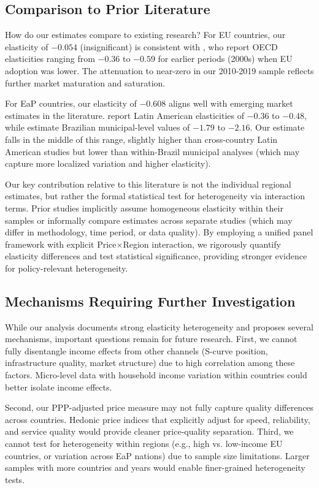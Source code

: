 \documentclass[12pt,review]{elsarticle}
\begin{document}
\subsection{Comparison to Prior Literature}

How do our estimates compare to existing research? For EU countries, our elasticity of $-0.054$ (insignificant) is consistent with \citet{cardona2009demand}, who report OECD elasticities ranging from $-0.36$ to $-0.59$ for earlier periods (2000s) when EU adoption was lower. The attenuation to near-zero in our 2010-2019 sample reflects further market maturation and saturation.

For EaP countries, our elasticity of $-0.608$ aligns well with emerging market estimates in the literature. \citet{galperin2017price} report Latin American elasticities of $-0.36$ to $-0.48$, while \citet{macedo2011elasticity} estimate Brazilian municipal-level values of $-1.79$ to $-2.16$. Our estimate falls in the middle of this range, slightly higher than cross-country Latin American studies but lower than within-Brazil municipal analyses (which may capture more localized variation and higher elasticity).

Our key contribution relative to this literature is not the individual regional estimates, but rather the formal statistical test for heterogeneity via interaction terms. Prior studies implicitly assume homogeneous elasticity within their samples or informally compare estimates across separate studies (which may differ in methodology, time period, or data quality). By employing a unified panel framework with explicit Price$\times$Region interaction, we rigorously quantify elasticity differences and test statistical significance, providing stronger evidence for policy-relevant heterogeneity.

\subsection{Mechanisms Requiring Further Investigation}

While our analysis documents strong elasticity heterogeneity and proposes several mechanisms, important questions remain for future research. First, we cannot fully disentangle income effects from other channels (S-curve position, infrastructure quality, market structure) due to high correlation among these factors. Micro-level data with household income variation within countries could better isolate income effects.

Second, our PPP-adjusted price measure may not fully capture quality differences across countries. Hedonic price indices that explicitly adjust for speed, reliability, and service quality would provide cleaner price-quality separation. Third, we cannot test for heterogeneity within regions (e.g., high vs. low-income EU countries, or variation across EaP nations) due to sample size limitations. Larger samples with more countries and years would enable finer-grained heterogeneity tests.
\end{document}
